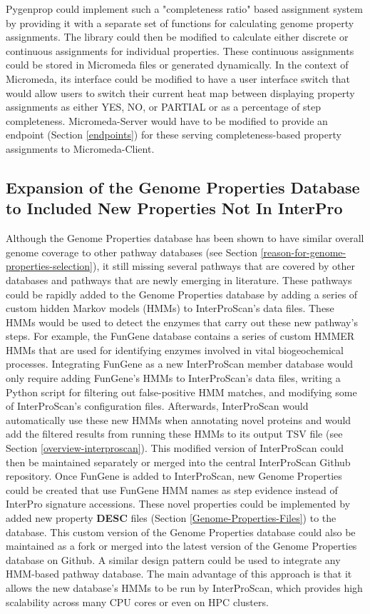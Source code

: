 Pygenprop could implement such a "completeness ratio" based assignment system by providing it with a separate set of functions for calculating genome property assignments. The library could then be modified to calculate either discrete or continuous assignments for individual properties. These continuous assignments could be stored in Micromeda files or generated dynamically. In the context of Micromeda, its interface could be modified to have a user interface switch that would allow users to switch their current heat map between displaying property assignments as either YES, NO, or PARTIAL or as a percentage of step completeness. Micromeda-Server would have to be modified to provide an endpoint (Section \ref{endpoints}) for these serving completeness-based property assignments to Micromeda-Client.

\subsection{Expansion of the Genome Properties Database to Included New Properties Not In InterPro}

Although the Genome Properties database has been shown to have similar overall genome coverage to other pathway databases (see Section \ref{reason-for-genome-properties-selection}), it still missing several pathways that are covered by other databases and pathways that are newly emerging in literature. These pathways could be rapidly added to the Genome Properties database by adding a series of custom hidden Markov models (HMMs) \cite{eddy2011accelerated} to InterProScan's data files. These HMMs would be used to detect the enzymes that carry out these new pathway's steps. For example, the FunGene \cite{fish2013fungene} database contains a series of custom HMMER \cite{eddy2011accelerated} HMMs that are used for identifying enzymes involved in vital biogeochemical processes. Integrating FunGene as a new InterProScan member database would only require adding FunGene's HMMs to InterProScan's data files, writing a Python script for filtering out false-positive HMM matches, and modifying some of InterProScan's configuration files. Afterwards, InterProScan would automatically use these new HMMs when annotating novel proteins and would add the filtered results from running these HMMs to its output TSV file (see Section \ref{overview-interproscan}). This modified version of InterProScan could then be maintained separately or merged into the central InterProScan Github repository. Once FunGene is added to InterProScan, new Genome Properties could be created that use FunGene HMM names as step evidence instead of InterPro signature accessions. These novel properties could be implemented by added new property \textbf{DESC} files (Section \ref{Genome-Properties-Files}) to the database. This custom version of the Genome Properties database could also be maintained as a fork or merged into the latest version of the Genome Properties database on Github. A similar design pattern could be used to integrate any HMM-based pathway database. The main advantage of this approach is that it allows the new database's HMMs to be run by InterProScan, which provides high scalability across many CPU cores or even on HPC clusters.

